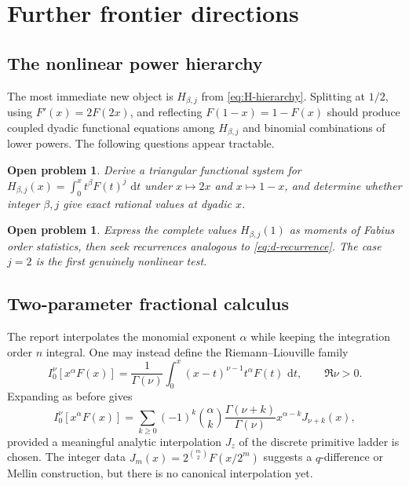 \documentclass[11pt,oneside]{article}
\numberwithin{equation}{section}
\newtheorem{problem}[theorem]{Open problem}
\theoremstyle{definition}
\theoremstyle{remark}
\newcommand{\dd}{\,\mathrm d}
\begin{document}
\section{Further frontier directions}
\label{sec:frontiers}

\subsection{The nonlinear power hierarchy}

The most immediate new object is $H_{\beta,j}$ from \eqref{eq:H-hierarchy}.  Splitting at
$1/2$, using $F'(x)=2F(2x)$, and reflecting $F(1-x)=1-F(x)$ should produce coupled dyadic
functional equations among $H_{\beta,j}$ and binomial combinations of lower powers.  The
following questions appear tractable.

\begin{problem}
Derive a triangular functional system for
\(
H_{\beta,j}(x)=\int_0^x t^\beta F(t)^j\,\dd t
\)
under $x\mapsto2x$ and $x\mapsto1-x$, and determine whether integer $\beta,j$ give exact
rational values at dyadic $x$.
\end{problem}

\begin{problem}
Express the complete values $H_{\beta,j}(1)$ as moments of Fabius order statistics, then
seek recurrences analogous to \eqref{eq:d-recurrence}.  The case $j=2$ is the first genuinely
nonlinear test.
\end{problem}

\subsection{Two-parameter fractional calculus}

The report interpolates the monomial exponent $\alpha$ while keeping the integration order
$n$ integral.  One may instead define the Riemann--Liouville family
\begin{equation}
 I_0^\nu[x^\alpha F(x)]
 =\frac1{\Gamma(\nu)}\int_0^x(x-t)^{\nu-1}t^\alpha F(t)\,\dd t,
 \qquad\Re\nu>0.                                             \label{eq:fractional-order}
\end{equation}
Expanding as before gives
\begin{equation}
 I_0^\nu[x^\alpha F(x)]
 =\sum_{k\ge0}(-1)^k\binom\alpha k
 \frac{\Gamma(\nu+k)}{\Gamma(\nu)}x^{\alpha-k}J_{\nu+k}(x), \label{eq:formal-two-parameter}
\end{equation}
provided a meaningful analytic interpolation $J_z$ of the discrete primitive ladder is
chosen.  The integer data
\(
J_m(x)=2^{\binom m2}F(x/2^m)
\)
suggests a $q$-difference or Mellin construction, but there is no canonical interpolation
yet.
\end{document}
